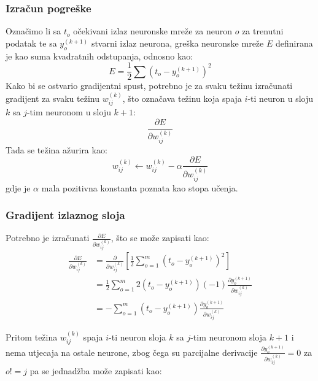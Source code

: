 \documentclass[times, utf8, zavrsni, numeric]{fer}
\begin{document}
\subsubsection{Izračun pogreške}
Označimo li sa $t_o$ očekivani izlaz neuronske mreže za neuron $o$ za trenutni podatak te sa $y_o^{(k + 1)}$ stvarni izlaz neurona, greška neuronske mreže $E$ definirana je kao suma kvadratnih odstupanja, odnosno kao:
\[
    E = \frac{1}{2}\sum(t_o-y_o^{(k + 1)})^2
\]
Kako bi se ostvario gradijentni spust, potrebno je za svaku težinu izračunati gradijent za svaku težinu $w_{ij}^{(k)}$, što označava težinu koja spaja $i$-ti neuron u sloju $k$ sa $j$-tim neuronom u sloju $k+1$:
\[
    \frac{\partial E}{\partial w_{ij}^{(k)}}
\]
Tada se težina ažurira kao:
\[
    w_{ij}^{(k)} \leftarrow w_{ij}^{(k)} - \alpha \frac{\partial E}{\partial w_{ij}^{(k)}}
\]
gdje je $\alpha$ mala pozitivna konstanta poznata kao stopa učenja.

\subsubsection{Gradijent izlaznog sloja}
Potrebno je izračunati $\frac{\partial E}{\partial w_{ij}^{(k)}}$, što se može zapisati kao:
\begin{equation*}
\begin{split}
    \frac{\partial E}{\partial w_{ij}^{(k)}}
        & = \frac{\partial}{\partial w_{ij}^{(k)}} 
        \left[\frac{1}{2}\displaystyle\sum_{o = 1}^m(t_o - y_o^{(k + 1)})^2\right]\\
        & = \frac{1}{2} \displaystyle\sum_{o = 1}^m2(t_o - y_o^{(k + 1)})(-1) \frac{\partial y_o^{(k + 1)}}{\partial w_{ij}^{(k)}} \\
        & = -\displaystyle\sum_{o = 1}^m(t_o - y_o^{(k + 1)})\frac{\partial y_o^{(k + 1)}}{\partial w_{ij}^{(k)}}
\end{split}
\end{equation*}

Pritom težina $w_{ij}^{(k)}$ spaja $i$-ti neuron sloja $k$ sa $j$-tim neuronom sloja $k+1$ i nema utjecaja na ostale neurone, zbog čega su parcijalne derivacije $\frac{\partial y_o^{(k + 1)}}{\partial w_{ij}^{(k)}} = 0$ za $o != j$ pa se jednadžba može zapisati kao:
\end{document}
